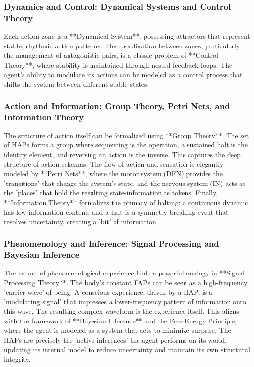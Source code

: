 \subsubsection{Dynamics and Control: Dynamical Systems and Control Theory}
\label{ssubsec:formal_dynamics}
Each action zone is a **Dynamical System**, possessing attractors that represent stable, rhythmic action patterns. The coordination between zones, particularly the management of antagonistic pairs, is a classic problem of **Control Theory**, where stability is maintained through nested feedback loops. The agent's ability to modulate its actions can be modeled as a control process that shifts the system between different stable states.

\subsubsection{Action and Information: Group Theory, Petri Nets, and Information Theory}
\label{ssubsec:formal_action}
The structure of action itself can be formalized using **Group Theory**. The set of HAPs forms a group where sequencing is the operation, a sustained halt is the identity element, and reversing an action is the inverse. This captures the deep structure of action schemas. The flow of action and sensation is elegantly modeled by **Petri Nets**, where the motor system (DFN) provides the 'transitions' that change the system's state, and the nervous system (IN) acts as the 'places' that hold the resulting state-information as tokens. Finally, **Information Theory** formalizes the primacy of halting: a continuous dynamic has low information content, and a halt is a symmetry-breaking event that resolves uncertainty, creating a 'bit' of information.

\subsubsection{Phenomenology and Inference: Signal Processing and Bayesian Inference}
\label{ssubsec:formal_phenomenology}
The nature of phenomenological experience finds a powerful analogy in **Signal Processing Theory**. The body's constant FAPs can be seen as a high-frequency 'carrier wave' of being. A conscious experience, driven by a HAP, is a 'modulating signal' that impresses a lower-frequency pattern of information onto this wave. The resulting complex waveform is the experience itself. This aligns with the framework of **Bayesian Inference** and the Free Energy Principle, where the agent is modeled as a system that acts to minimize surprise. The HAPs are precisely the 'active inferences' the agent performs on its world, updating its internal model to reduce uncertainty and maintain its own structural integrity.